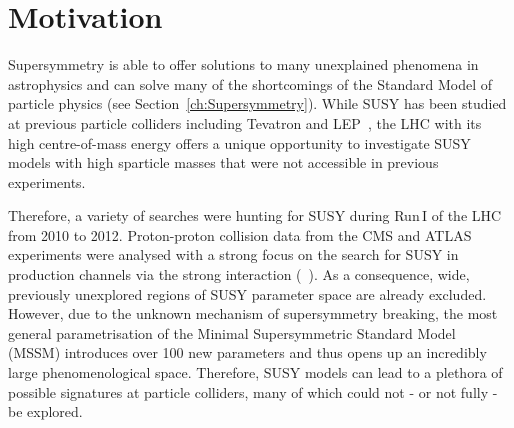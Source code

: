 
\FloatBarrier
\chapter{Motivation}
\label{sec:Motivation}
Supersymmetry is able to offer solutions to many unexplained phenomena in astrophysics and can solve many of the shortcomings of the Standard Model of particle physics (see Section~\ref{ch:Supersymmetry}).
While SUSY has been studied at previous particle colliders including Tevatron and LEP~\cite{bib:Tevatron:SUSY_results,bib:LEP:SUSY_results}, the LHC with its high centre-of-mass energy offers a unique opportunity to investigate SUSY models with high sparticle masses that were not accessible in previous experiments.

Therefore, a variety of searches were hunting for SUSY during Run\,I of the LHC from 2010 to 2012.
Proton-proton collision data from the CMS and ATLAS experiments were analysed with a strong focus on the search for SUSY in production channels via the strong interaction (\eg~\cite{bib:CMS:RA2_8TeV,bib:CMS:MT2_8TeV,bib:ATLAS:JetPlusMET_8TeV}).
As a consequence, wide, previously unexplored regions of SUSY parameter space are already excluded.
However, due to the unknown mechanism of supersymmetry breaking, the most general parametrisation of the Minimal Supersymmetric Standard Model (MSSM) introduces over 100 new parameters and thus opens up an incredibly large phenomenological space. 
Therefore, SUSY models can lead to a plethora of possible signatures at particle colliders, many of which could not - or not fully - be explored. \\

